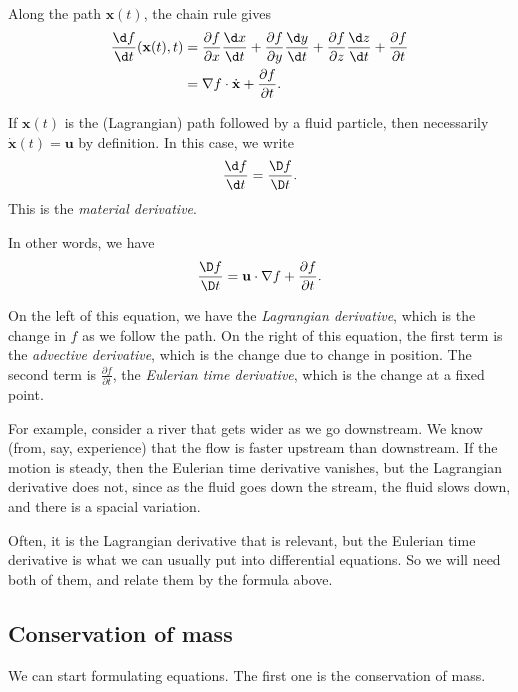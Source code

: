 \documentclass[a4paper]{article}
\begin{document}
Along the path $\mathbf{x}(t)$, the chain rule gives
\begin{align*}
  \frac{\d f}{\d t}(\mathbf{x}(t), t) &= \frac{\partial f}{\partial x} \frac{\d x}{\d t} + \frac{\partial f}{\partial y}\frac{\d y}{\d t} + \frac{\partial f}{\partial z}\frac{\d z}{\d t} + \frac{\partial f}{\partial t}\\
  &= \nabla f \cdot \dot{\mathbf{x}} + \frac{\partial f}{\partial t}.
\end{align*}
\begin{defi}
  If $\mathbf{x}(t)$ is the (Lagrangian) path followed by a fluid particle, then necessarily $\dot{\mathbf{x}}(t) = \mathbf{u}$ by definition. In this case, we write
  \[
    \frac{\d f}{\d t} = \frac{\D f}{\D t}.
  \]
  This is the \emph{material derivative}.

  In other words, we have
  \[
    \frac{\D f}{\D t} = \mathbf{u}\cdot \nabla f + \frac{\partial f}{\partial t}.
  \]
\end{defi}
On the left of this equation, we have the \emph{Lagrangian derivative}, which is the change in $f$ as we follow the path. On the right of this equation, the first term is the \emph{advective derivative}, which is the change due to change in position. The second term is $\frac{\partial f}{\partial t}$, the \emph{Eulerian time derivative}, which is the change at a fixed point.

For example, consider a river that gets wider as we go downstream. We know (from, say, experience) that the flow is faster upstream than downstream. If the motion is steady, then the Eulerian time derivative vanishes, but the Lagrangian derivative does not, since as the fluid goes down the stream, the fluid slows down, and there is a spacial variation.

Often, it is the Lagrangian derivative that is relevant, but the Eulerian time derivative is what we can usually put into differential equations. So we will need both of them, and relate them by the formula above.

\subsection{Conservation of mass}
We can start formulating equations. The first one is the conservation of mass.
\end{document}
